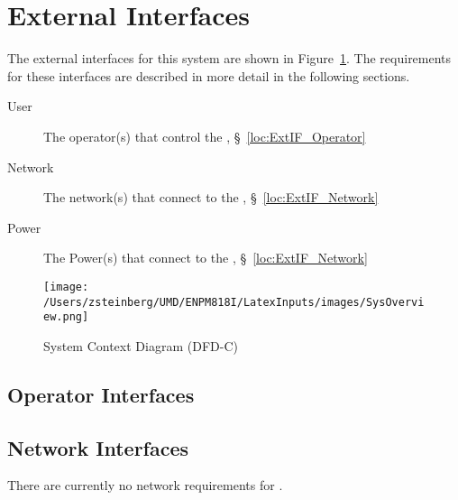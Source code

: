 \newpage
\section{External Interfaces}
\label{loc:ExternalInterfaces}
% 

The external interfaces for this system are shown in Figure~\ref{fig:DFD-C}.
The requirements for these interfaces are described in more detail in the following sections.
\begin{description}
	\item[User] The operator(s) that control the \ThisSys, \S~\ref{loc:ExtIF_Operator}
	\item[Network] The network(s) that connect to the \ThisSys, \S~\ref{loc:ExtIF_Network}
	\item[Power] The Power(s) that connect to the \ThisSys, \S~\ref{loc:ExtIF_Network}
\end{description}
\begin{figure}[htbp]
	\centering
		\texttt{[image: /Users/zsteinberg/UMD/ENPM818I/LatexInputs/images/SysOverview.png]}
	\caption[System Context Diagram]{System Context Diagram (DFD-C)}
	\label{fig:DFD-C}
\end{figure}

\KNEADSUBSECTIONNEWPAGE
\subsection{Operator Interfaces}
\label{loc:ExtIF_Operator}




\subsection{Network Interfaces}
\label{loc:ExtIF_Network}
There are currently no network requirements for \ThisSystem.

% 

